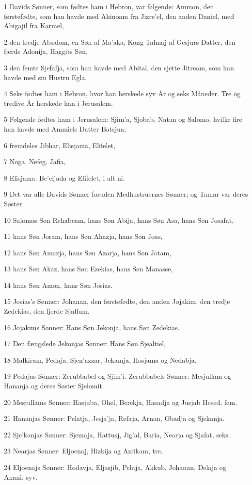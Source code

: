\par 1 Davids Sønner, som fødtes ham i Hebron, var følgende: Ammon, den førstefødte, som han havde med Ahinoam fra Jizre'el, den anden Daniel, med Abigajil fra Karmel,
\par 2 den tredje Absalom, en Søn af Ma'aka, Kong Talmaj af Gesjurs Datter, den fjerde Adonija, Haggits Søn,
\par 3 den femte Sjefafja, som han havde med Abital, den sjette Jitream, som han havde med sin Hustru Egla.
\par 4 Seks fødtes ham i Hebron, hvor han herskede syv År og seks Måneder. Tre og tredive År herskede han i Jerusalem.
\par 5 Følgende fødtes ham i Jerusalem: Sjim'a, Sjobab, Natan og Salomo, hvilke fire han havde med Ammiels Datter Batsjua;
\par 6 fremdeles Jibhar, Elisjama, Elifelet,
\par 7 Noga, Nefeg, Jafia,
\par 8 Elisjama. Be'eljada og Elifelet, i alt ni.
\par 9 Det var alle Davids Sønner foruden Medhustruernes Sønner; og Tamar var deres Søster.
\par 10 Salomos Søn Rehabeam, hans Søn Abija, hans Søn Asa, hans Søn Josafat,
\par 11 hans Søn Joram, hans Søn Ahazja, hans Søn Joas,
\par 12 hans Søn Amazja, hans Søn Azarja, hans Søn Jotam,
\par 13 hans Søn Akaz, hans Søn Ezekias, hans Søn Manasse,
\par 14 hans Søn Amon, hans Søn Josias.
\par 15 Josias's Sønner: Johanan, den førstefødte, den anden Jojakim, den tredje Zedekias, den fjerde Sjallum.
\par 16 Jojakims Sønner: Hans Søn Jekonja, hans Søn Zedekias.
\par 17 Den fængslede Jekonjas Sønner: Hans Søn Sjealtiel,
\par 18 Malkiram, Pedaja, Sjen'azzar, Jekamja, Hosjama og Nedabja.
\par 19 Pedajas Sønner: Zerubbabel og Sjim'i. Zerubbabels Sønner: Mesjullam og Hananja og deres Søster Sjelomit.
\par 20 Mesjullams Sønner: Hasjuba, Ohel, Berekja, Hasadja og Jusjab Hesed, fem.
\par 21 Hananjas Sønner: Pelatja, Jesja'ja, Refaja, Arnan, Obadja og Sjekanja.
\par 22 Sje'kanjas Sønner: Sjemaja, Hattusj, Jig'al, Baria, Nearja og Sjafat, seks.
\par 23 Nearjas Sønner: Eljoenaj, Hizkija og Azrikam, tre.
\par 24 Eljoenajs Sønner: Hodavja, Eljasjib, Pelaja, Akkub, Johanan, Delaja og Anani, syv.

